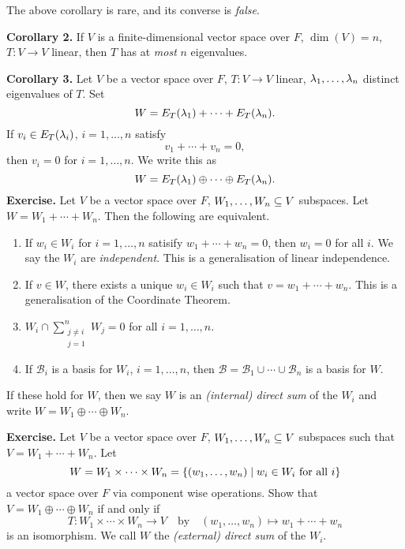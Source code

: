 \documentclass[class=article, crop=false]{standalone}
\begin{document}
  \begin{note}{}
    The above corollary is rare, and its converse is \emph{false}.
  \end{note}
  \textbf{Corollary 2.} If $V$ is a finite-dimensional vector space over $F$, $\dim(V)=n$, $T\colon V\to V$ linear, then $T$ has at \emph{most} $n$ eigenvalues. \par
  \textbf{Corollary 3.} Let $V$ be a vector space over $F$, $T\colon V\to V$ linear, $\lambda_1,\dotsc,\lambda_n$ distinct eigenvalues of $T$. Set 
  \[
    W = E_T(\lambda_1) + \dotsb + E_T(\lambda_n).
  \]
  If $v_i\in E_T(\lambda_i)$, $i=1,\dotsc,n$ satisfy
  \[
    v_1+\dotsb+v_n = 0,
  \]
  then $v_i = 0$ for $i = 1,\dotsc,n$. We write this as
  \[
    W = E_T(\lambda_1) \oplus \dotsb \oplus E_T(\lambda_n).
  \]
  \textbf{Exercise.} Let $V$ be a vector space over $F$, $W_1,\dotsc,W_n\subseteq V$ subspaces. Let $W = W_1+\dotsb+W_n$. Then the following are equivalent.
  \begin{enumerate}[label=(\alph*)]
    \item If $w_i\in W_i$ for $i=1,\dotsc,n$ satisify $w_1+\dotsb+w_n=0$, then $w_i = 0$ for all $i$. We say the $W_i$ are \emph{independent}. This is a generalisation of linear independence.
    \item If $v\in W$, there exists a unique $w_i\in W_i$ such that $v = w_1+\dotsb+w_n$. This is a generalisation of the Coordinate Theorem.
    \item $W_i\cap \sum\limits_{\substack{j\neq i\\j = 1}}^n W_j = 0$ for all $i = 1,\dotsc,n$.
    \item If $\mathcal{B}_i$ is a basis for $W_i$, $i = 1,\dotsc,n$, then $\mathcal{B} = \mathcal{B}_1\cup\dotsb\cup\mathcal{B}_n$ is a basis for $W$.
  \end{enumerate}
  If these hold for $W$, then we say $W$ is an \emph{(internal) direct sum} of the $W_i$ and write $W = W_1\oplus\dotsb\oplus W_n$. \par
  \textbf{Exercise.} Let $V$ be a vector space over $F$, $W_1,\dotsc,W_n\subseteq V$ subspaces such that $V = W_1+\dotsb+W_n$. Let
  \[
    W = W_1\times \dotsb\times W_n = \left\{(w_1,\dotsc,w_n)\mid w_i\in W_i \text{ for all }i\right\}
  \]
  a vector space over $F$ via component wise operations. Show that $V = W_1\oplus\dotsb\oplus W_n$ if and only if 
  \[
    T\colon W_1\times \dotsb\times W_n\to V \quad\text{by}\quad (w_1,\dotsc,w_n)\mapsto w_1+\dotsb+w_n
  \]
  is an isomorphism. We call $W$ the \emph{(external) direct sum} of the $W_i$. \par
\end{document}
